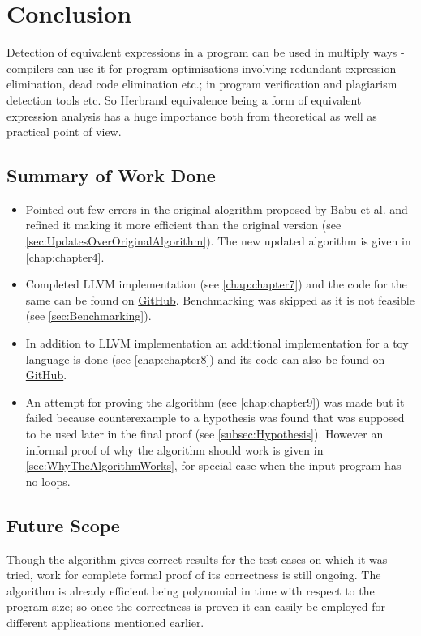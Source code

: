 \chapter{Conclusion}
\label{chap:chapter10}
Detection of equivalent expressions in a program can be used in multiply ways - compilers can use it for program optimisations involving redundant expression elimination, dead code elimination etc.; in program verification and plagiarism detection tools etc. So Herbrand equivalence being a form of equivalent expression analysis has a huge importance both from theoretical as well as practical point of view.

\section{Summary of Work Done}
\label{sec:SummaryOfWorkDone}
\begin{itemize}
    \item Pointed out few errors in the original alogrithm proposed by Babu et al. 
    \cite{Babu} and refined it making it more efficient than the original
    version (see \autoref{sec:UpdatesOverOriginalAlgorithm}). The new updated
    algorithm is given in \autoref{chap:chapter4}.
    \item Completed LLVM implementation (see \autoref{chap:chapter7}) and the code for the same can be found on \href{https://github.com/himanshu520/HerbrandEquivalence/tree/master/LLVM}{GitHub}.
    Benchmarking was skipped as it is not feasible (see \autoref{sec:Benchmarking}).
    \item In addition to LLVM implementation an additional implementation for
    a toy language is done (see \autoref{chap:chapter8}) and its code can also 
    be found on \href{https://github.com/himanshu520/HerbrandEquivalence/tree/master/ToyLanguage}{GitHub}.
    \item An attempt for proving the algorithm (see \autoref{chap:chapter9}) 
    was made but it failed because counterexample to a hypothesis was found that was supposed to be used later in the final proof
    (see \autoref{subsec:Hypothesis}). However an informal proof of why the 
    algorithm should work is given in \autoref{sec:WhyTheAlgorithmWorks}, 
    for special case when the input program has no loops.
\end{itemize}

\section{Future Scope}
Though the algorithm gives correct results for the test cases on which it was tried, work for complete formal proof of its correctness is still ongoing. The algorithm is already efficient being polynomial in time with respect to the program size; so once the correctness is proven it can easily be employed for different applications mentioned earlier.